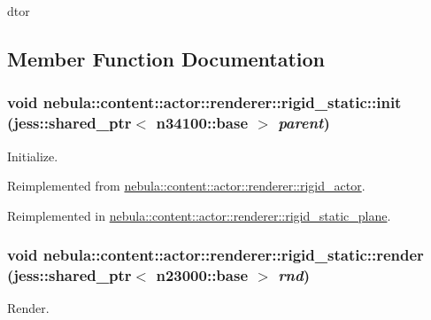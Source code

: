 dtor 

\subsection{Member Function Documentation}
\hypertarget{classnebula_1_1content_1_1actor_1_1renderer_1_1rigid__static_a44a1c6a982296b5f1d4c0919c2c4ecf1}{
\subsubsection[{init}]{\setlength{\rightskip}{0pt plus 5cm}void nebula::content::actor::renderer::rigid\_\-static::init (jess::shared\_\-ptr$<$ {\bf n34100::base} $>$ {\em parent})}}
\label{classnebula_1_1content_1_1actor_1_1renderer_1_1rigid__static_a44a1c6a982296b5f1d4c0919c2c4ecf1}


Initialize. 

Reimplemented from \hyperlink{classnebula_1_1content_1_1actor_1_1renderer_1_1rigid__actor_aefd8a0b2b060c60669607f3cc060b607}{nebula::content::actor::renderer::rigid\_\-actor}.

Reimplemented in \hyperlink{classnebula_1_1content_1_1actor_1_1renderer_1_1rigid__static__plane_aae78beb9e7389ea77d6a8103ec388972}{nebula::content::actor::renderer::rigid\_\-static\_\-plane}.\hypertarget{classnebula_1_1content_1_1actor_1_1renderer_1_1rigid__static_a37251ebb4a8c07abdff018bc8d1537fb}{
\subsubsection[{render}]{\setlength{\rightskip}{0pt plus 5cm}void nebula::content::actor::renderer::rigid\_\-static::render (jess::shared\_\-ptr$<$ {\bf n23000::base} $>$ {\em rnd})}}
\label{classnebula_1_1content_1_1actor_1_1renderer_1_1rigid__static_a37251ebb4a8c07abdff018bc8d1537fb}


Render. 

